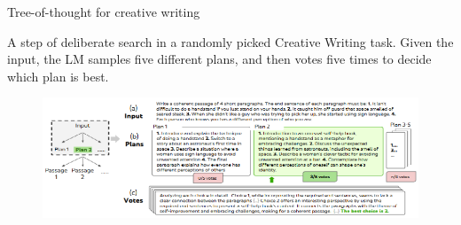 

\begin{vbframe}{Tree-of-thought for creative writing}

\vfill

A step of deliberate search in a randomly picked Creative Writing task. Given the input, the LM samples five different plans, and then votes five times to decide which plan is best.
    
\begin{figure}
    \centering
    \includegraphics{figure/tot_creative_writing.png}\\
\end{figure}

\vfill

\end{vbframe}


\endlecture

